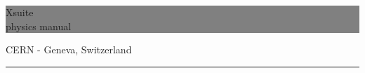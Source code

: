 \documentclass[a4paper,12pt]{book}
\numberwithin{equation}{section}
\newcommand{\HRule}[1]{\hfill \rule{0.2\linewidth}{#1}}
\begin{document}
\thispagestyle{empty} %


\colorbox{Gray}{
	\parbox[t]{1.0\linewidth}{
		\centering \fontsize{28pt}{40pt}\selectfont %
		\vspace*{0.7cm} %

		\hfill Xsuite \\
		\hfill physics manual


		\vspace*{0.7cm} %
	}
}


                \vfill


{\centering \large
\hfill CERN - Geneva, Switzerland

\HRule{1pt}} %


\clearpage %

\newpage

\tableofcontents

\newpage


\renewcommand*{\arraystretch}{1.4}











\end{document}
